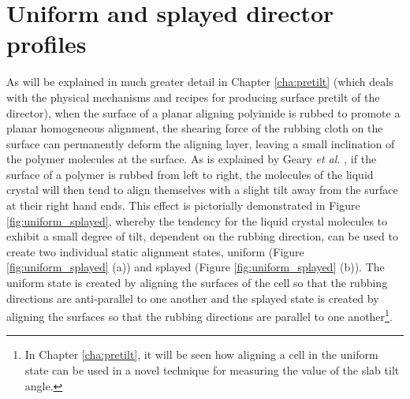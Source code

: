 \section{Uniform and splayed director profiles}
As will be explained in much greater detail in Chapter \ref{cha:pretilt} (which deals with the physical mechanisms and recipes for producing surface pretilt of the director), when the surface of a planar aligning polyimide is rubbed to promote a planar homogeneous alignment, the shearing force of the rubbing cloth on the surface can permanently deform the aligning layer, leaving a small inclination of the polymer molecules at the surface. As is explained by Geary \textit{et al.} \cite{Geary1987}, if the surface of a polymer is rubbed from left to right, the molecules of the liquid crystal will then tend to align themselves with a slight tilt away from the surface at their right hand ends. This effect is pictorially demonstrated in Figure \ref{fig:uniform_splayed}, whereby the tendency for the liquid crystal molecules to exhibit a small degree of tilt, dependent on the rubbing direction, can be used to create two individual static alignment states, uniform (Figure \ref{fig:uniform_splayed} (a)) and splayed (Figure \ref{fig:uniform_splayed} (b)). The uniform state is created by aligning the surfaces of the cell so that the rubbing directions are anti-parallel to one another and the splayed state is created by aligning the surfaces so that the rubbing directions are parallel to one another\footnote{In Chapter \ref{cha:pretilt}, it will be seen how aligning a cell in the uniform state can be used in a novel technique for measuring the value of the slab tilt angle.}.

